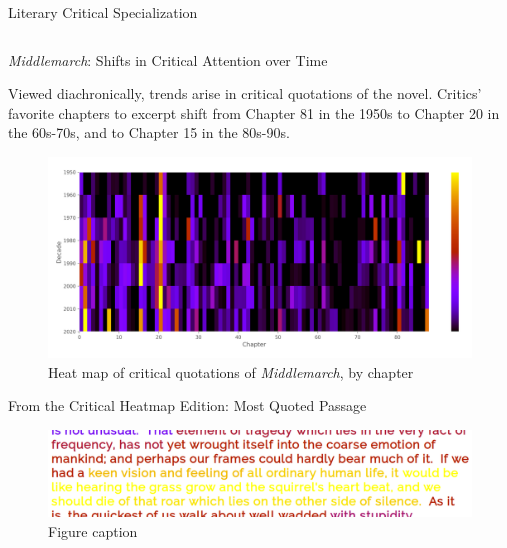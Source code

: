 \documentclass[final]{beamer}
\newlength{\onecolwid}
\newlength{\twocolwid}
\begin{document}
\begin{frame}[t]
\begin{columns}[t]
\begin{column}{\twocolwid}
\begin{columns}[t,totalwidth=\twocolwid]
\begin{column}{\onecolwid}
\begin{block}{Literary Critical Specialization}
\end{block}


\end{column} %

\end{columns} %


\begin{alertblock}{\emph{Middlemarch}: Shifts in Critical Attention over Time}

Viewed diachronically, trends arise in critical quotations of the novel. Critics' favorite chapters to excerpt shift from Chapter 81 in the 1950s to Chapter 20 in the 60s-70s, and to Chapter 15 in the 80s-90s. 

\begin{figure}
\includegraphics[width=0.9\linewidth]{diachronic.png}
\caption{Heat map of critical quotations of \emph{Middlemarch}, by chapter}
\end{figure}

\end{alertblock} 



\begin{block}{From the Critical Heatmap Edition: Most Quoted Passage}

\begin{figure}
\includegraphics[width=0.7\linewidth]{most-quoted.png}
\caption{Figure caption}
\end{figure}
\end{block} 


\end{column}
\end{columns}
\end{frame}
\end{document}
